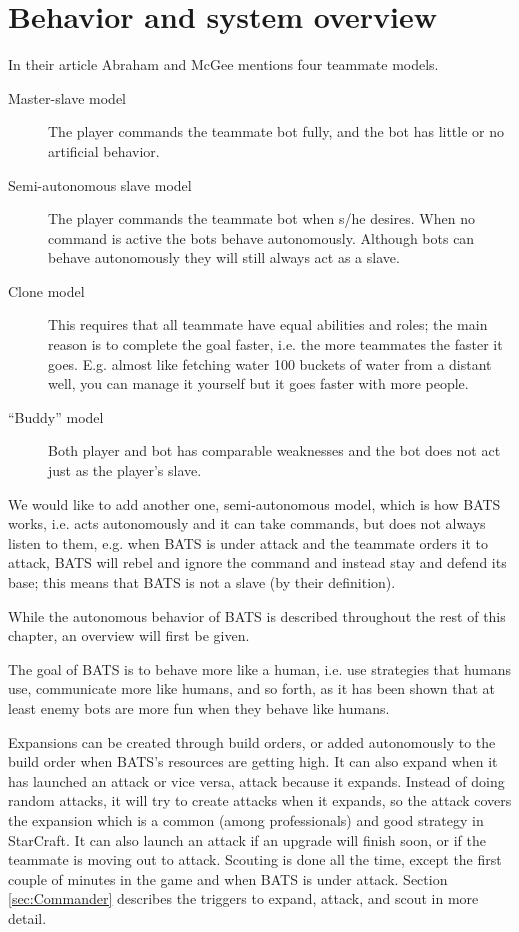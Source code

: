 \section{Behavior and system overview}
In their article\cite{abraham10} Abraham and McGee mentions four teammate models.
\begin{description}
	\item[Master-slave model] The player commands the teammate bot fully, and the bot has little or
	  no artificial behavior.
	\item[Semi-autonomous slave model] The player commands the teammate bot when s/he desires. When
	  no command is active the bots behave autonomously. Although bots can behave autonomously they
	  will still always act as a slave.
	\item[Clone model] This requires that all teammate have equal abilities and roles; the main
	  reason is to complete the goal faster, i.e. the more teammates the faster it goes. E.g. almost
	  like fetching water 100 buckets of water from a distant well, you can manage it yourself but
	  it goes faster with more people.
	\item[“Buddy” model] Both player and bot has comparable weaknesses and the bot does not act just
	  as the player’s slave.
\end{description}
We would like to add another one, semi-autonomous model, which is how BATS works, i.e. acts
autonomously and it can take commands, but does not always listen to them, e.g. when BATS is under
attack and the teammate orders it to attack, BATS will rebel and ignore the command and instead stay
and defend its base; this means that BATS is not a slave (by their definition).

While the autonomous behavior of BATS is described throughout the rest of this chapter, an overview
will first be given.

The goal of BATS is to behave more like a human, i.e. use strategies that humans use, communicate
more like humans, and so forth, as it has been shown that at least enemy bots are more fun when they
behave like humans\cite{soni08}.

Expansions can be created through build orders, or added autonomously to the build order when BATS's
resources are getting high. It can also expand when it has launched an attack or vice versa, attack
because it expands. Instead of doing random attacks, it will try to create attacks when it expands,
so the attack covers the expansion which is a common (among professionals) and good strategy in
StarCraft\cite{day9}. It can also launch an attack if an upgrade will finish soon, or if the
teammate is moving out to attack. Scouting is done all the time, except the first couple of minutes
in the game and when BATS is under attack. Section \ref{sec:Commander} 
describes the triggers to expand, attack, and scout in more detail.

